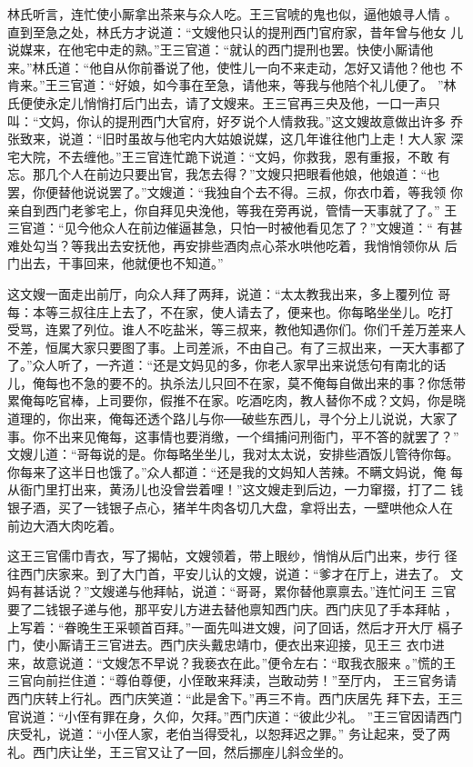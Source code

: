 林氏听言，连忙使小厮拿出茶来与众人吃。王三官唬的鬼也似，逼他娘寻人情
。直到至急之处，林氏方才说道：“文嫂他只认的提刑西门官府家，昔年曾与他女
儿说媒来，在他宅中走的熟。”王三官道：“就认的西门提刑也罢。快使小厮请他
来。”林氏道：“他自从你前番说了他，使性儿一向不来走动，怎好又请他？他也
不肯来。”王三官道：“好娘，如今事在至急，请他来，等我与他陪个礼儿便了。
”林氏便使永定儿悄悄打后门出去，请了文嫂来。王三官再三央及他，一口一声只
叫：“文妈，你认的提刑西门大官府，好歹说个人情救我。”这文嫂故意做出许多
乔张致来，说道：“旧时虽故与他宅内大姑娘说媒，这几年谁往他门上走！大人家
深宅大院，不去缠他。”王三官连忙跪下说道：“文妈，你救我，恩有重报，不敢
有忘。那几个人在前边只要出官，我怎去得？”文嫂只把眼看他娘，他娘道：“也
罢，你便替他说说罢了。”文嫂道：“我独自个去不得。三叔，你衣巾着，等我领
你亲自到西门老爹宅上，你自拜见央浼他，等我在旁再说，管情一天事就了了。”
王三官道：“见今他众人在前边催逼甚急，只怕一时被他看见怎了？”文嫂道：“
有甚难处勾当？等我出去安抚他，再安排些酒肉点心茶水哄他吃着，我悄悄领你从
后门出去，干事回来，他就便也不知道。”

这文嫂一面走出前厅，向众人拜了两拜，说道：“太太教我出来，多上覆列位
哥每：本等三叔往庄上去了，不在家，使人请去了，便来也。你每略坐坐儿。吃打
受骂，连累了列位。谁人不吃盐米，等三叔来，教他知遇你们。你们千差万差来人
不差，恒属大家只要图了事。上司差派，不由自己。有了三叔出来，一天大事都了
了。”众人听了，一齐道：“还是文妈见的多，你老人家早出来说恁句有南北的话
儿，俺每也不急的要不的。执杀法儿只回不在家，莫不俺每自做出来的事？你恁带
累俺每吃官棒，上司要你，假推不在家。吃酒吃肉，教人替你不成？文妈，你是晓
道理的，你出来，俺每还透个路儿与你──破些东西儿，寻个分上儿说说，大家了
事。你不出来见俺每，这事情也要消缴，一个缉捕问刑衙门，平不答的就罢了？”
文嫂儿道：“哥每说的是。你每略坐坐儿，我对太太说，安排些酒饭儿管待你每。
你每来了这半日也饿了。”众人都道：“还是我的文妈知人苦辣。不瞒文妈说，俺
每从衙门里打出来，黄汤儿也没曾尝着哩！”这文嫂走到后边，一力窜掇，打了二
钱银子酒，买了一钱银子点心，猪羊牛肉各切几大盘，拿将出去，一壁哄他众人在
前边大酒大肉吃着。

这王三官儒巾青衣，写了揭帖，文嫂领着，带上眼纱，悄悄从后门出来，步行
径往西门庆家来。到了大门首，平安儿认的文嫂，说道：“爹才在厅上，进去了。
文妈有甚话说？”文嫂递与他拜帖，说道：“哥哥，累你替他禀禀去。”连忙问王
三官要了二钱银子递与他，那平安儿方进去替他禀知西门庆。西门庆见了手本拜帖
，上写着：“眷晚生王采顿首百拜。”一面先叫进文嫂，问了回话，然后才开大厅
槅子门，使小厮请王三官进去。西门庆头戴忠靖巾，便衣出来迎接，见王三
衣巾进来，故意说道：“文嫂怎不早说？我亵衣在此。”便令左右：“取我衣服来
。”慌的王三官向前拦住道：“尊伯尊便，小侄敢来拜渎，岂敢动劳！”至厅内，
王三官务请西门庆转上行礼。西门庆笑道：“此是舍下。”再三不肯。西门庆居先
拜下去，王三官说道：“小侄有罪在身，久仰，欠拜。”西门庆道：“彼此少礼。
”王三官因请西门庆受礼，说道：“小侄人家，老伯当得受礼，以恕拜迟之罪。”
务让起来，受了两礼。西门庆让坐，王三官又让了一回，然后挪座儿斜佥坐的。

